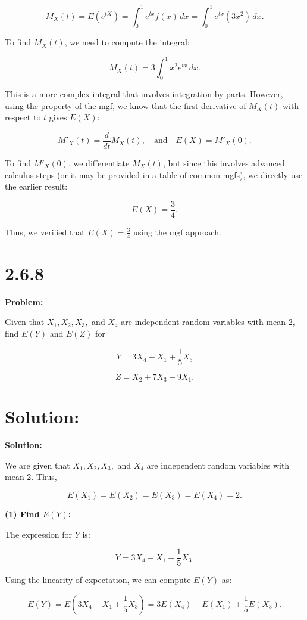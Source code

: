 \documentclass{article}
\begin{document}
\[
M_X(t) = E(e^{tX}) = \int_0^1 e^{tx} f(x) \, dx = \int_0^1 e^{tx} (3x^2) \, dx.
\]

To find \( M_X(t) \), we need to compute the integral:

\[
M_X(t) = 3 \int_0^1 x^2 e^{tx} \, dx.
\]

This is a more complex integral that involves integration by parts. However, using the property of the mgf, we know that the first derivative of \( M_X(t) \) with respect to \( t \) gives \( E(X) \):

\[
M'_X(t) = \frac{d}{dt} M_X(t), \quad \text{and} \quad E(X) = M'_X(0).
\]

To find \( M'_X(0) \), we differentiate \( M_X(t) \), but since this involves advanced calculus steps (or it may be provided in a table of common mgfs), we directly use the earlier result:

\[
E(X) = \frac{3}{4}.
\]

Thus, we verified that \( E(X) = \frac{3}{4} \) using the mgf approach.


\section*{2.6.8}

\textbf{Problem:}

Given that \( X_1, X_2, X_3, \) and \( X_4 \) are independent random variables with mean 2, find \( E(Y) \) and \( E(Z) \) for

\[
Y = 3X_4 - X_1 + \frac{1}{5} X_3
\]

\[
Z = X_2 + 7X_3 - 9X_1.
\]


\section*{Solution:}

\textbf{Solution:}

We are given that \( X_1, X_2, X_3, \) and \( X_4 \) are independent random variables with mean 2. Thus,

\[
E(X_1) = E(X_2) = E(X_3) = E(X_4) = 2.
\]

\textbf{(1) Find \( E(Y) \):}

The expression for \( Y \) is:

\[
Y = 3X_4 - X_1 + \frac{1}{5} X_3.
\]

Using the linearity of expectation, we can compute \( E(Y) \) as:

\[
E(Y) = E(3X_4 - X_1 + \frac{1}{5} X_3) = 3E(X_4) - E(X_1) + \frac{1}{5} E(X_3).
\]
\end{document}
